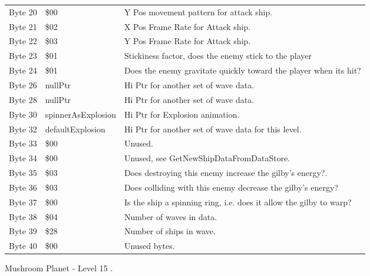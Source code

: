 \begin{figure}[H]
{\begin{adjustbox}{width=12cm}
\begin{tabular}{lll}
 Byte 20 & \$00                & Y Pos movement pattern for attack ship.                            \\
 Byte 21 & \$02                & X Pos Frame Rate for Attack ship.                                  \\
 Byte 22 & \$03                & Y Pos Frame Rate for Attack ship.                                  \\
 Byte 23 & \$01                & Stickiness factor, does the enemy stick to the player              \\
 Byte 24 & \$01                & Does the enemy gravitate quickly toward the player when its hit?   \\
 Byte 26 & nullPtr            & Hi Ptr for another set of wave data.                               \\
 Byte 28 & nullPtr            & Hi Ptr for another set of wave data.                               \\
 Byte 30 & spinnerAsExplosion & Hi Ptr for Explosion animation.                                    \\
 Byte 32 & defaultExplosion   & Hi Ptr for another set of wave data for this level.                \\
 Byte 33 & \$00                & Unused.                                                            \\
 Byte 34 & \$00                & Unused, see GetNewShipDataFromDataStore.                           \\
 Byte 35 & \$03                & Does destroying this enemy increase the gilby's energy?.           \\
 Byte 36 & \$03                & Does colliding with this enemy decrease the gilby's energy?        \\
 Byte 37 & \$00                & Is the ship a spinning ring, i.e. does it allow the gilby to warp? \\
 Byte 38 & \$04                & Number of waves in data.                                           \\
 Byte 39 & \$28                & Number of ships in wave.                                           \\
 Byte 40 & \$00                & Unused bytes.                                                      \\
\bottomrule
\end{tabular}

  \end{adjustbox}

  }\caption*{Mushroom Planet - Level 15
.}
\end{figure}

